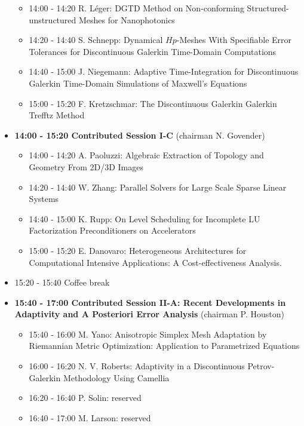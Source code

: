 \documentclass[10pt, A4]{article}%
\begin{document}
\begin{itemize}
  \begin{itemize}
    \item 14:00 - 14:20 {R. Léger}: {DGTD  Method  on  Non-conforming  Structured-unstructured  Meshes  for Nanophotonics}
    \item 14:20 - 14:40 {S. Schnepp}: {Dynamical $Hp$-Meshes With Specifiable Error Tolerances for Discontinuous Galerkin Time-Domain Computations}
    \item 14:40 - 15:00 {J. Niegemann}: {Adaptive Time-Integration for Discontinuous Galerkin Time-Domain Simulations of Maxwell's Equations}
    \item 15:00 - 15:20 {F. Kretzschmar}: {The Discontinuous Galerkin Galerkin Trefftz Method}
  \end{itemize}
    \item {\bf 14:00 - 15:20 Contributed Session I-C} (chairman N. Govender) 
  \begin{itemize}
    \item 14:00 - 14:20 {A. Paoluzzi}: {Algebraic Extraction of Topology and Geometry From 2D/3D Images}
    \item 14:20 - 14:40 {W. Zhang}: {Parallel Solvers for Large Scale Sparse Linear Systems} %
    \item 14:40 - 15:00 {K. Rupp}: {On Level Scheduling for Incomplete LU Factorization Preconditioners on Accelerators}
    \item 15:00 - 15:20 {E. Danovaro}: {Heterogeneous Architectures for Computational Intensive Applications: A Cost-effectiveness Analysis.}
  \end{itemize}
  \item 15:20 - 15:40 Coffee break
  \newpage
  \item {\bf 15:40 - 17:00 Contributed Session II-A: Recent Developments in Adaptivity and A Posteriori Error Analysis} (chairman P. Houston) 
  \begin{itemize}
    \item 15:40 - 16:00 {M. Yano}: {Anisotropic Simplex Mesh Adaptation by Riemannian Metric Optimization: Application to Parametrized Equations}
    \item 16:00 - 16:20 {N. V. Roberts}: {Adaptivity in a Discontinuous Petrov-Galerkin Methodology Using Camellia}
    \item 16:20 - 16:40 {P. Solin}: reserved %
    \item 16:40 - 17:00 {M. Larson}: reserved %

\end{itemize}
\end{itemize}
\end{document}
